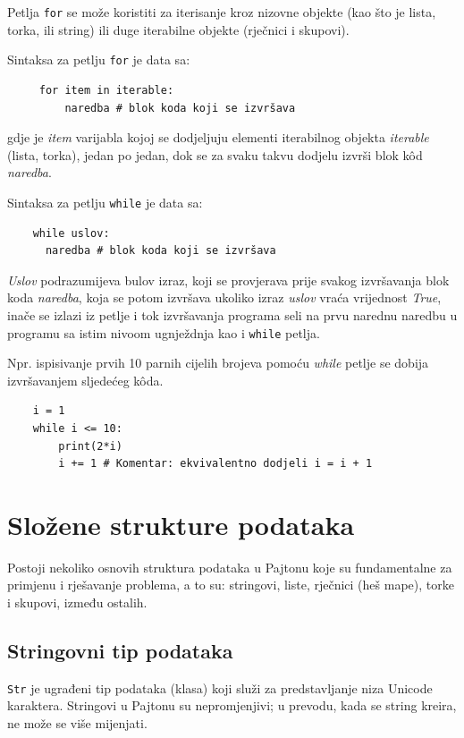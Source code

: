 Petlja \texttt{for} se može koristiti  za iterisanje kroz nizovne objekte (kao što je lista, torka, ili string) ili duge iterabilne objekte (rječnici i skupovi).

Sintaksa za petlju \texttt{for} je data sa:
\begin{verbatim}
     for item in iterable:
         naredba # blok koda koji se izvršava
\end{verbatim}
gdje je \emph{item} varijabla kojoj se dodjeljuju elementi iterabilnog objekta \textit{iterable} (lista, torka), jedan po jedan, dok se za svaku takvu dodjelu izvrši blok k\^od \emph{naredba}. 
 
Sintaksa za petlju \texttt{while} je data sa:

\begin{verbatim}
    while uslov:
	  naredba # blok koda koji se izvršava
\end{verbatim}
\emph{Uslov} podrazumijeva bulov izraz, koji se provjerava prije svakog izvrša\-vanja blok koda \emph{naredba}, koja se potom izvršava ukoliko izraz \emph{uslov} vraća vrijednost  \emph{True}, inače se izlazi iz petlje i tok izvršavanja programa seli na prvu narednu naredbu u programu sa istim nivoom ugnježdnja kao i \texttt{while} petlja. 

Npr. ispisivanje prvih 10 parnih cijelih brojeva pomoću \textit{while} petlje se dobija izvršavanjem sljedećeg k\^oda.

\begin{verbatim}
	i = 1
	while i <= 10:
	    print(2*i)
	    i += 1 # Komentar: ekvivalentno dodjeli i = i + 1
\end{verbatim}

\section{Složene strukture podataka}

Postoji nekoliko osnovih struktura podataka  u Pajtonu koje su fundame\-ntalne za primjenu i rješavanje problema, a to su: stringovi, liste, rječnici (heš mape), torke i skupovi, između ostalih.  %

\subsection{Stringovni tip podataka}

\texttt{Str} je ugrađeni tip podataka (klasa) koji služi za predstavljanje niza Unicode karaktera. Stringovi u Pajtonu su nepromjenjivi; u prevodu, kada se string kreira, ne može se više mijenjati.

